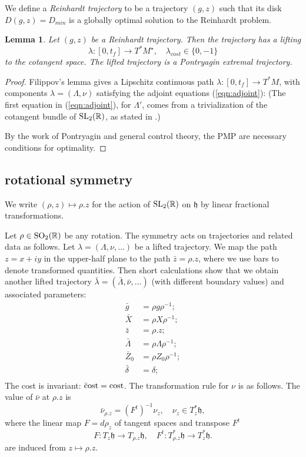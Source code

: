 \documentclass{article}
\newtheorem{lemma}[theorem]{Lemma}
\theoremstyle{remark}
\newcommand{\ring}[1]{\mathbb{#1}}
\newcommand{\op}[1]{\hbox{#1}}
\def\SL{\op{SL}_2(\ring{R})}
\def\SO{\op{SO}_2(\ring{R})}
\def\h{\mathfrak h}
\def\Mstar{M^\star}
\def\DR{D_{min}}
\begin{document}
We define a {\it Reinhardt trajectory} to be a trajectory $(g,z)$ such
that its disk $D(g,z)=\DR$ is a globally optimal solution to the
Reinhardt problem.

\begin{lemma} Let $(g,z)$ be a Reinhardt trajectory.
Then the trajectory has a lifting
\[
\lambda:[0,t_f]\to T^*\Mstar, \quad\lambda_{cost}\in \{0,-1\}
\] to the cotangent space.  The lifted trajectory is a Pontryagin
extremal trajectory.
\end{lemma}


\begin{proof} 
  Filippov's lemma gives a Lipschitz continuous path
  $\lambda:[0,t_f]\to T^*M$, with components
  $\lambda=(\Lambda,\nu)$ satisfying the
  adjoint equations (\ref{eqn:adjoint}):
(The first equation in (\ref{eqn:adjoint}), for $\Lambda'$, comes from
a trivialization of the cotangent bundle of $\SL$, as stated in
\cite[Eqn.18.18]{agrachev2013control}.)

By the work of Pontryagin and general control theory, 
the PMP are necessary conditions
for optimality.
\end{proof}

\subsection{rotational symmetry}\label{sec:sym}

We write $(\rho,z)\mapsto \rho.z$ for the action of $\SL$ on $\h$ by
linear fractional transformations.

Let $\rho\in \SO$ be any rotation.  The symmetry acts on trajectories
and related data as follows.  Let $\lambda=(\Lambda,\nu,\ldots)$ be a
lifted trajectory.  We map the path $z=x+iy$ in the upper-half plane to
the path $\bar z = \rho.z$, where we use bars to denote transformed
quantities.  Then short calculations show that we obtain another
lifted trajectory $\bar\lambda=(\bar \Lambda,\bar \nu,\ldots)$ (with
different boundary values) and associated parameters:
\begin{align*}
\bar g &= \rho g \rho^{-1};\\
\bar X &= \rho X \rho^{-1};\\
\bar z &= \rho.z;\\ 
\bar \Lambda &= \rho\Lambda \rho^{-1};\\
\bar Z_0 &= \rho Z_0 \rho^{-1};\\
\bar \delta &= \delta;\\
\end{align*}
The cost is invariant: $ {\op{\={c}ost}} = \op{cost}$.    
The transformation rule for 
$\nu$ is as follows.
The value of $\bar\nu$ at $\rho.z$ is 
\[
\bar\nu_{\rho.z} = (F^t)^{-1} \nu_z,\quad \nu_z\in T_z^*\h,
\]
where the linear map $F= d\rho_z$ of tangent spaces and transpose $F^t$
\[
F:T_z\h\to T_{\rho.z}\h,\quad F^t:T_{\rho.z}^*\h\to T_z^*\h.
\]
are induced from $z\mapsto \rho.z$.
\end{document}
